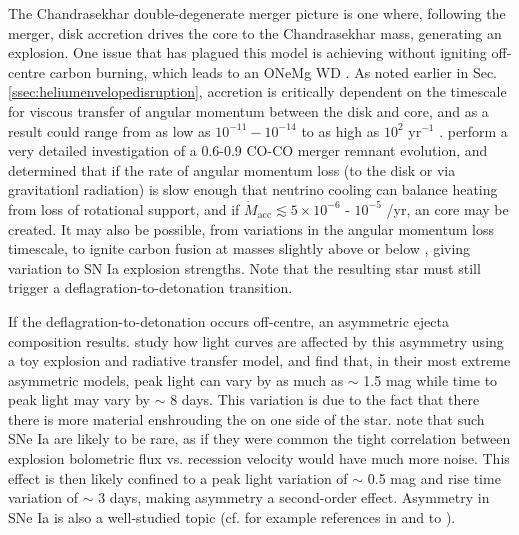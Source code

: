 The Chandrasekhar double-degenerate merger picture is one where, following the merger, disk accretion drives the core to the Chandrasekhar mass, generating an explosion.  One issue that has plagued this model is achieving {\Mchan} without igniting off-centre carbon burning, which leads to an ONeMg WD \citep{yoonpr07,loreig09}.  As noted earlier in Sec. \ref{ssec:heliumenvelopedisruption}, accretion is critically dependent on the timescale for viscous transfer of angular momentum between the disk and core, and as a result could range from as low as $10^{-11} - 10^{-14}$ to as high as $10^2$ {\Msun} yr$^{-1}$ \citep{loreig09}.  \citeauthor{yoonpr07} perform a very detailed investigation of a 0.6-0.9 {\Mchan} CO-CO merger remnant evolution, and determined that if the rate of angular momentum loss (to the disk or via gravitationl radiation) is slow enough that neutrino cooling can balance heating from loss of rotational support, and if $\dot{M}_\mathrm{acc} \lesssim 5 \times 10^{-6}$ - $10^{-5}$ {\Msun}/yr, an {\Mchan} core may be created.  It may also be possible, from variations in the angular momentum loss timescale, to ignite carbon fusion at masses slightly above or below {\Mchan}, giving variation to SN Ia explosion strengths.  Note that the resulting star must still trigger a deflagration-to-detonation transition.

If the deflagration-to-detonation occurs off-centre, an asymmetric ejecta composition results.  \cite{sim+07} study how light curves are affected by this asymmetry using a toy explosion and radiative transfer model, and find that, in their most extreme asymmetric models, peak light can vary by as much as $\sim$ 1.5 mag while time to peak light may vary by $\sim$ 8 days.  This variation is due to the fact that there there is more material enshrouding the {\Ni} on one side of the star.  \cite{sim+07} note that such SNe Ia are likely to be rare, as if they were common the tight correlation between explosion bolometric flux vs. recession velocity would have much more noise.  This effect is then likely confined to a peak light variation of $\sim$ 0.5 mag and rise time variation of $\sim$ 3 days, making asymmetry a second-order effect.  Asymmetry in SNe Ia is also a well-studied topic (cf. for example references in and to \cite{sim+07}).

